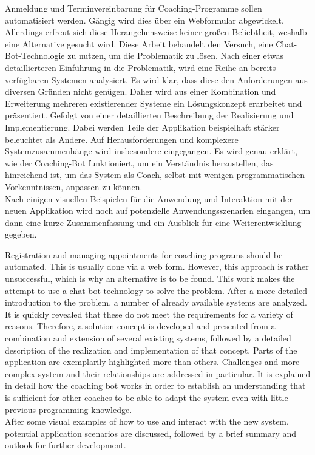\kurzfassung

Anmeldung und Terminvereinbarung für Coaching-Programme sollen automatisiert werden. Gängig wird dies über ein Webformular abgewickelt. Allerdings erfreut sich diese Herangehensweise keiner großen Beliebtheit, weshalb eine Alternative gesucht wird. Diese Arbeit behandelt den Versuch, eine Chat-Bot-Technologie zu nutzen, um die Problematik zu lösen. Nach einer etwas detaillierteren Einführung in die Problematik, wird eine Reihe an bereits verfügbaren Systemen analysiert. Es wird klar, dass diese den Anforderungen aus diversen Gründen nicht genügen. Daher wird aus einer Kombination und Erweiterung mehreren existierender Systeme ein Lösungskonzept erarbeitet und präsentiert. Gefolgt von einer detaillierten Beschreibung der Realisierung und Implementierung. Dabei werden Teile der Applikation beispielhaft stärker beleuchtet als Andere. Auf Herausforderungen und komplexere Systemzusammenhänge wird insbesondere eingegangen. Es wird genau erklärt, wie der Coaching-Bot funktioniert, um ein Verständnis herzustellen, das hinreichend ist, um das System als Coach, selbst mit wenigen programmatischen Vorkenntnissen, anpassen zu können. \\
Nach einigen visuellen Beispielen für die Anwendung und Interaktion mit der neuen Applikation wird noch auf potenzielle Anwendungsszenarien eingangen, um dann eine kurze Zusammenfassung und ein Ausblick für eine Weiterentwicklung gegeben. 

\kurzfassungEN

Registration and managing appointments for coaching programs should be automated. This is usually done via a web form. However, this approach is rather unsuccessful, which is why an alternative is to be found. This work makes the attempt to use a chat bot technology to solve the problem. After a more detailed introduction to the problem, a number of already available systems are analyzed. It is quickly revealed that these do not meet the requirements for a variety of reasons. Therefore, a solution concept is developed and presented from a combination and extension of several existing systems, followed by a detailed description of the realization and implementation of that concept. Parts of the application are exemplarily highlighted more than others. Challenges and more complex system and their relationships are addressed in particular. It is explained in detail how the coaching bot works in order to establish an understanding that is sufficient for other coaches to be able to adapt the system even with little previous programming knowledge. \\
After some visual examples of how to use and interact with the new system, potential application scenarios are discussed, followed by a brief summary and outlook for further development. 
